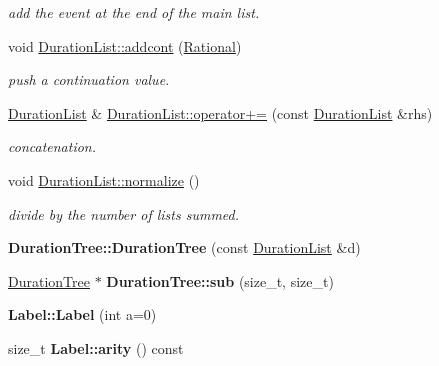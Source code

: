 \begin{DoxyCompactItemize}
\begin{DoxyCompactList}\small\item\em add the event at the end of the main list. \end{DoxyCompactList}\item 
void \mbox{\hyperlink{group__output_gab9d508060073c83c27e13f8f2472de38}{Duration\+List\+::addcont}} (\mbox{\hyperlink{classRational}{Rational}})
\begin{DoxyCompactList}\small\item\em push a continuation value. \end{DoxyCompactList}\item 
\mbox{\hyperlink{classDurationList}{Duration\+List}} \& \mbox{\hyperlink{group__output_ga06ae4f865c1c27edd490f1631d76452a}{Duration\+List\+::operator+=}} (const \mbox{\hyperlink{classDurationList}{Duration\+List}} \&rhs)
\begin{DoxyCompactList}\small\item\em concatenation. \end{DoxyCompactList}\item 
\mbox{\label{group__output_ga20a55c27bcb4ec4f639d4f7f79153be5}} 
void \mbox{\hyperlink{group__output_ga20a55c27bcb4ec4f639d4f7f79153be5}{Duration\+List\+::normalize}} ()
\begin{DoxyCompactList}\small\item\em divide by the number of lists summed. \end{DoxyCompactList}\item 
\mbox{\label{group__output_ga2c12fa35cd11a35a98e4680975e3f8b8}} 
{\bfseries Duration\+Tree\+::\+Duration\+Tree} (const \mbox{\hyperlink{classDurationList}{Duration\+List}} \&d)
\item 
\mbox{\label{group__output_ga524c96edadc8725d997f81de3663ce4d}} 
\mbox{\hyperlink{classDurationTree}{Duration\+Tree}} $\ast$ {\bfseries Duration\+Tree\+::sub} (size\+\_\+t, size\+\_\+t)
\item 
\mbox{\label{group__output_gaa2d2c8bb6a5bd48679122a220a9d8d00}} 
{\bfseries Label\+::\+Label} (int a=0)
\item 
\mbox{\label{group__output_ga189208973cef74bb65357535d43885ed}} 
size\+\_\+t {\bfseries Label\+::arity} () const
\item 

\end{DoxyCompactItemize}
